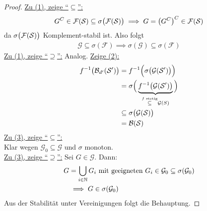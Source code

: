 \begin{proof}\enter
\underline{Zu (1), zeige ``$\subseteq$'':}
\begin{align*}
G^C\in\mathcal{F}(\S)\subseteq\sigma\big(\mathcal{F}(\S)\big)
\implies
G=\big(G^C\big)^C\in\mathcal{F}(\S)
\end{align*}
da $\sigma\big(\mathcal{F}(\S)\big)$ Komplement-stabil ist. Also folgt
\begin{align*}
\mathcal{G}\subseteq\sigma(\mathcal{F})
\implies\sigma(\mathcal{G})\subseteq\sigma(\mathcal{F})
\end{align*}
\underline{Zu (1), zeige ``$\supseteq$'':} Analog.\nl
\underline{Zeige (2):}
\begin{align*}
f^{-1}\big(\B_{d'}(\S')\big)&=f^{-1}\Big(\sigma\big(\mathcal{G}(\S')\big)\Big)\\
&=\sigma\Big(\underbrace{f^{-1}\big(\mathcal{G}(\S')\big)}_{\stackrel{f\text{ stetig}}{\subseteq}\mathcal{G}(S)}\Big)\\
&\subseteq\sigma\big(\mathcal{G}(\S)\big)\\
&=\B(\S)
\end{align*}
\underline{Zu (3), zeige ``$\subseteq$'':}\\
Klar wegen $\mathcal{G}_0\subseteq\mathcal{G}$ und $\sigma$ monoton.\\
\underline{Zu (3), zeige ``$\supseteq$'':} Sei $G\in\mathcal{G}$. Dann:
\begin{align*}
G&=\bigcup\limits_{i\in\N} G_i\mit\text{geeigneten }G_i\in\mathcal{G}_0\subseteq\sigma(\mathcal{G}_0)\\
&\implies
G\in\sigma(\mathcal{G}_0)
\end{align*}
Aus der Stabilität unter Vereinigungen folgt die Behauptung.
\end{proof}


